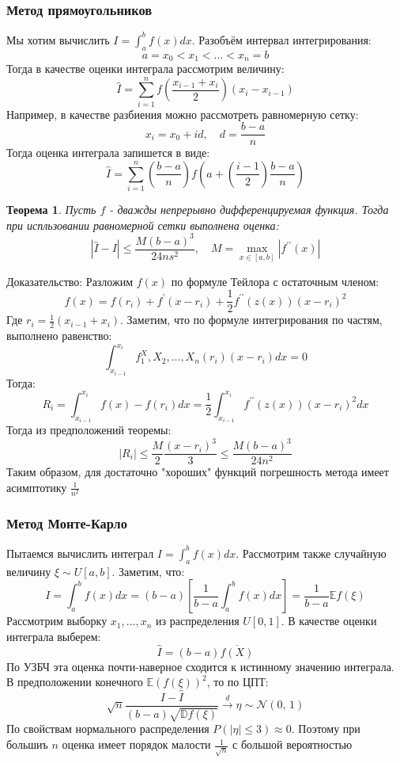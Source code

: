 \documentclass[a4paper,12pt]{article}
\newcommand{\expec}{\mathbb{E}}
\newcommand{\disp}{\mathbb{D}}
\newcommand{\normal}[2]{\mathcal{N}(#1,\,#2)}
\newcommand{\dconv}{\overset{d}{\to}}
\newcommand{\sumin}{\sum\limits_{i=1}^n}
\newcommand{\sample}{X_1, X_2, ..., X_n}
\theoremstyle{named}
\newtheorem*{namedtheorem}{Теорема}
\begin{document}
\subsubsection{Метод прямоугольников}
Мы хотим вычислить $I = \int_{a}^b f(x) dx$. Разобъём интервал интегрирования:
$$
    a = x_0 < x_1 < ... < x_n = b
$$
Тогда в качестве оценки интеграла рассмотрим величину:
$$
    \hat I = \sumin f\left(\frac{x_{i-1} + x_i}{2}\right)(x_i - x_{i-1})
$$
Например, в качестве разбиения можно рассмотреть равномерную сетку:
$$
    x_i = x_0 + id, \quad d = \frac{b-a}{n}
$$
Тогда оценка интеграла запишется в виде:
$$
    \hat I = \sumin \left(\frac{b-a}{n}\right)f\left(a + \left(\frac{i-1}{2}\right)\frac{b-a}{n}\right)
$$
\begin{namedtheorem}
    Пусть $f$ - дважды непрерывно дифференцируемая функция. Тогда при испльзовании равномерной сетки выполнена оценка:
    $$
        |\hat I - I| \leq \frac{M(b-a)^3}{24ns^2}, \quad M = \max_{x\in [a, b]}|f^{\prime\prime}(x)|
    $$
\end{namedtheorem}
Доказательство: Разложим $f(x)$ по формуле Тейлора с остаточным членом:
$$
    f(x) = f(r_i) + f^\prime(x - r_i) + \frac{1}{2}f^{\prime\prime}(z(x))(x-r_i)^2
$$
Где $r_i = \frac12(x_{i-1} + x_i)$. Заметим, что по формуле интегрирования по частям, выполнено равенство:
$$
    \int_{x_{i-1}}^{x_i} f^\sample(r_i)(x - r_i)dx = 0
$$
Тогда:
$$
    R_i = \int_{x_{i-1}}^{x_i} f(x) - f(r_i) dx = \frac{1}{2}\int_{x_{i-1}}^{x_i} f^{\prime\prime}(z(x))(x-r_i)^2 dx
$$
Тогда из предположений теоремы:
$$
    |R_i| \leq \frac{M}{2}\frac{(x-r_i)^3}{3} \leq \frac{M(b-a)^3}{24n^2}
$$
Таким образом, для достаточно "хороших" функций погрешность метода имеет асимптотику $\frac{1}{n^2}$
\subsubsection{Метод Монте-Карло}
Пытаемся вычислить интеграл $I = \int_{a}^b f(x) dx$. Рассмотрим также случайную величину $\xi \sim U[a, b]$. 
Заметим, что:
$$
    I = \int_{a}^b f(x) dx = (b-a)\left[\frac{1}{b-a}\int_{a}^b f(x) dx\right] = \frac{1}{b-a}\expec f(\xi)
$$
Рассмотрим выборку $x_1, ..., x_n$ из распределения $U[0, 1]$. В качестве оценки интеграла выберем:
$$
    \hat I = (b-a)\overline{f(X)}
$$
По УЗБЧ эта оценка почти-наверное сходится к истинному значению интеграла. В предположении конечного $\expec(f(\xi))^2$, то 
по ЦПТ:
$$
    \sqrt{n}\frac{I - \hat I}{(b-a)\sqrt{\disp f(\xi)}} \dconv \eta \sim \normal{0}{1}
$$
По свойствам нормального распределения $P(|\eta| \leq 3) \approx 0$. Поэтому при большиъ $n$ оценка имеет порядок малости $\frac{1}{\sqrt{n}}$
с большой вероятностью 
\end{document}
